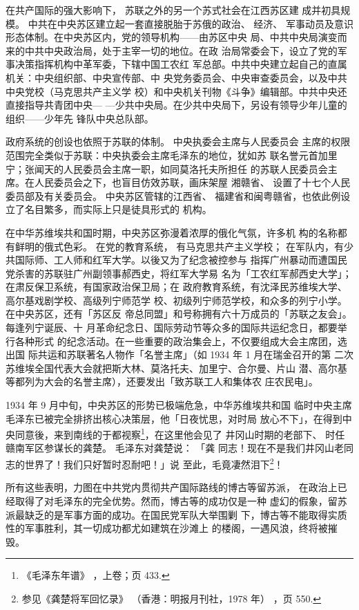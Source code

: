 在共产国际的强大影响下，
苏联之外的另一个苏式社会在江西苏区建
成并初具规模。
中共在中央苏区建立起一套直接脱胎于苏俄的政治、
经济、
军事动员及意识形态体制。在中央苏区内，党的领导机构——由苏区中央
局、中共中央局演变而来的中共中央政治局，处于主宰一切的地位。在政
治局常委会下，设立了党的军事决策指挥机构中革军委，下辖中国工农红
军总部。中共中央建立起自己的直属机关：中央组织部、中央宣传部、中
央党务委员会、中央审查委员会，以及中共中央党校（马克思共产主义学
校）和中央机关刊物《斗争》编辑部。中共中央还直接指导共青团中央—
—少共中央局。在少共中央局下，另设有领导少年儿童的组织——少年先
锋队中央总队部。

政府系统的创设也依照于苏联的体制。
中央执委会主席与人民委员会
主席的权限范围完全类似于苏联：中央执委会主席毛泽东的地位，犹如苏
联名誉元首加里宁；张闻天的人民委员会主席一职，如同莫洛托夫所担任
的苏联人民委员会主席。在人民委员会之下，也盲目仿效苏联，画床架屋
湘赣省、
设置了十七个人民委员部及有关委员会。
中央苏区管辖的江西省、
福建省和闽粤赣省，也依此例设立了名目繁多，而实际上只是徒具形式的
机构。

在中华苏维埃共和国时期，中央苏区弥漫着浓厚的俄化气氛，许多机
构的名称都有鲜明的俄式色彩。
在党的教育系统，
有马克思共产主义学校；
在军队内，有少共国际师、工人师和红军大学。以後又为了纪念被控参与
指挥广州暴动而遭国民党杀害的苏联驻广州副领事郝西史，将红军大学易
名为「工农红军郝西史大学」；在肃反保卫系统，有国家政治保卫局；在
政府教育系统，有沈泽民苏维埃大学、高尔基戏剧学校、高级列宁师范学
校、初级列宁师范学校，和众多的列宁小学。在中央苏区，还有「苏区反
帝总同盟」和号称拥有六十万成员的「苏联之友会」。每逢列宁诞辰、十
月革命纪念日、国际劳动节等众多的国际共运纪念日，都要举行各种形式
的纪念活动。在一些重要的政治集会上，不仅要组成大会主席团，选出国
际共运和苏联著名人物作「名誉主席」（如 1934 年 1 月在瑞金召开的第
二次苏维埃全国代表大会就把斯大林、莫洛托夫、加里宁、合尔曼、片山
潜、高尔基等都列为大会的名誉主席），还要发出「致苏联工人和集体农
庄农民电」。

1934 年 9 月中旬，中央苏区的形势已极端危急，中华苏维埃共和国
临时中央主席毛泽东已被完全排挤出核心决策层，他「日夜忧思，对时局
放心不下」，在得到中央同意後，来到南线的于都视察\footnote{《毛泽东年谱》
，上卷；页 433.}，在这里他会见了
井冈山时期的老部下、
时任赣南军区参谋长的龚楚。
毛泽东对龚楚说：
「龚
同志！现在不是我们井冈山老同志的世界了！我们只好暂时忍耐吧！」说
至此，毛竟凄然泪下\footnote{参见《龚楚将军回忆录》
（香港：明报月刊社，1978 年）
，页 550.}！

所有这些表明，力图在中共党内贯彻共产国际路线的博古等留苏派，
在政治上已经取得了对毛泽东的完全优势。然而，博古等的成功仅是一种
虚幻的假象，留苏派最缺乏的是军事方面的成功。在国民党军队大举围剿
下，博古等不能取得实质性的军事胜利，其一切成功都尤如建筑在沙滩上
的楼阁，一遇风浪，终将被摧毁。
